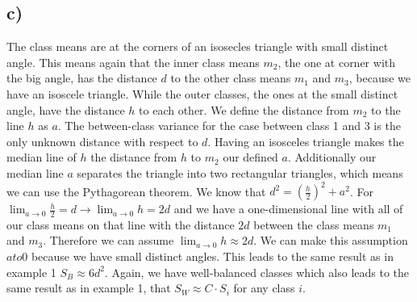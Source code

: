 \documentclass[paper=a4,fontsize=10pt,DIV11,BCOR10mm]{scrartcl}
\begin{document}
\subsection*{c)}
The class means are at the corners of an isosecles triangle with small distinct angle. This means again that the inner class means $m_2$, the one at corner with the big angle, has the distance $d$ to the other class means $m_1$ and $m_3$, because we have an isoscele triangle. While the outer classes, the ones at the small distinct angle, have the distance $h$ to each other. We define the distance from $m_2$ to the line $h$ as $a$. The between-class variance for the case between class 1 and 3 is the only unknown distance with respect to $d$. Having an isosceles triangle makes the median line of $h$ the distance from $h$ to $m_2$ our defined $a$. Additionally our median line $a$ separates the triangle into two rectangular triangles, which means we can use the Pythagorean theorem. We know that $ d^2 = (\frac{h}{2})^2 + a^2$. For $\lim_{a \to 0} \frac{h}{2} = d \rightarrow \lim_{a \to 0} h = 2d $ and we have a one-dimensional line with all of our class means on that line with the distance $2d$ between the class means $m_1$ and $m_3$. Therefore we can assume $\lim_{a \to 0}h \approx 2d$. We can make this assumption $a to 0$ because we have small distinct angles. This leads to the same result as in example 1 $S_B \approx 6d^2$.
Again, we have well-balanced classes which also leads to the same result as in example 1, that $S_W \approx C \cdot S_i$ for any class $i$.

 
\end{document}
